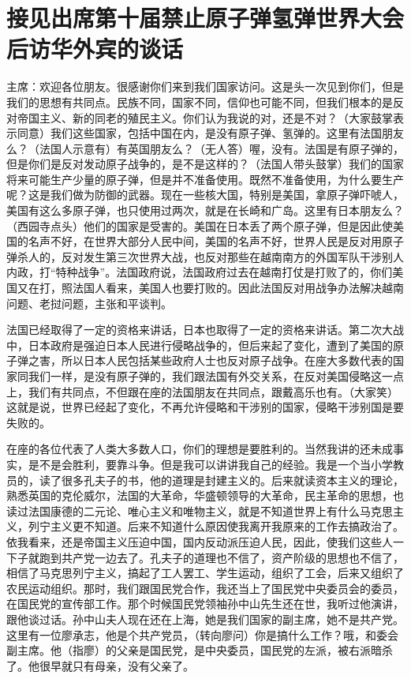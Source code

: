 \section[接见出席第十届禁止原子弹氢弹世界大会后访华外宾的谈话（一九六四年八月二十二日）]{接见出席第十届禁止原子弹氢弹世界大会后访华外宾的谈话}


主席：欢迎各位朋友。很感谢你们来到我们国家访问。这是头一次见到你们，但是我们的思想有共同点。民族不同，国家不同，信仰也可能不同，但我们根本的是反对帝国主义、新的同老的殖民主义。你们认为我说的对，还是不对？（大家鼓掌表示同意）我们这些国家，包括中国在内，是没有原子弹、氢弹的。这里有法国朋友么？（法国人示意有）有英国朋友么？（无人答）喔，没有。法国是有原子弹的，但是你们是反对发动原子战争的，是不是这样的？（法国人带头鼓掌）我们的国家将来可能生产少量的原子弹，但是并不准备使用。既然不准备使用，为什么要生产呢？这是我们做为防御的武器。现在一些核大国，特别是美国，拿原子弹吓唬人，美国有这么多原子弹，也只使用过两次，就是在长崎和广岛。这里有日本朋友么？（西园寺点头）他们的国家是受害的。美国在日本丢了两个原子弹，但是因此使美国的名声不好，在世界大部分人民中间，美国的名声不好，世界人民是反对用原子弹杀人的，反对发生第三次世界大战，也反对那些在越南南方的外国军队干涉别人内政，打“特种战争”。法国政府说，法国政府过去在越南打仗是打败了的，你们美国又在打，照法国人看来，美国人也要打败的。因此法国反对用战争办法解决越南问题、老挝问题，主张和平谈判。

法国已经取得了一定的资格来讲话，日本也取得了一定的资格来讲话。第二次大战中，日本政府是强迫日本人民进行侵略战争的，但后来起了变化，遭到了美国的原子弹之害，所以日本人民包括某些政府人士也反对原子战争。在座大多数代表的国家同我们一样，是没有原子弹的，我们跟法国有外交关系，在反对美国侵略这一点上，我们有共同点，不但跟在座的法国朋友在共同点，跟戴高乐也有。（大家笑）这就是说，世界已经起了变化，不再允许侵略和干涉别的国家，侵略干涉别国是要失败的。

在座的各位代表了人类大多数人口，你们的理想是要胜利的。当然我讲的还未成事实，是不是会胜利，要靠斗争。但是我可以讲讲我自己的经验。我是一个当小学教员的，读了很多孔夫子的书，他的道理是封建主义的。后来就读资本主义的理论，熟悉英国的克伦威尔，法国的大革命，华盛顿领导的大革命，民主革命的思想，也读过法国康德的二元论、唯心主义和唯物主义，就是不知道世界上有什么马克思主义，列宁主义更不知道。后来不知道什么原因使我离开我原来的工作去搞政治了。依我看来，还是帝国主义压迫中国，国内反动派压迫人民，因此，使我们这些人一下子就跑到共产党一边去了。孔夫子的道理也不信了，资产阶级的思想也不信了，相信了马克思列宁主义，搞起了工人罢工、学生运动，组织了工会，后来又组织了农民运动组织。那时，我们跟国民党合作，我还当上了国民党中央委员会的委员，在国民党的宣传部工作。那个时候国民党领袖孙中山先生还在世，我听过他演讲，跟他谈过话。孙中山夫人现在还在上海，她是我们国家的副主席，她不是共产党。这里有一位廖承志，他是个共产党员，（转向廖问）你是搞什么工作？哦，和委会副主席。他（指廖）的父亲是国民党，是中央委员，国民党的左派，被右派暗杀了。他很早就只有母亲，没有父亲了。


